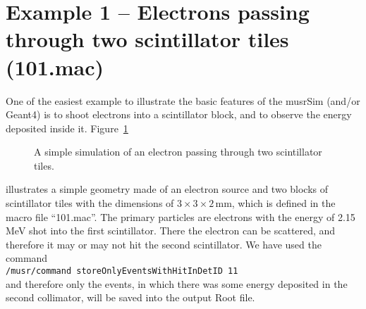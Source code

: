 \documentclass[twoside]{dis04}
\begin{document}
\section{Example 1 -- Electrons passing through two scintillator tiles (101.mac)}
One of the easiest example to illustrate the basic features of the musrSim (and/or Geant4) is to
shoot electrons into a scintillator block, and to observe the energy deposited inside it.
Figure~\ref{vis101}
%
\begin{figure}[tb]\centering
{}
\caption{A simple simulation of an electron passing through two
scintillator tiles.}
\label{vis101}
\end{figure}
%
illustrates a simple geometry made of an electron source and two blocks
of scintillator tiles with the dimensions of $3 \times 3 \times 2\,$mm,
which is defined in the macro file ``101.mac''.
The primary particles are electrons with the energy of 2.15\,MeV shot
into the first scintillator.  There the electron can be scattered, and therefore
it may or may not hit the second scintillator.  We have used the command\\[2ex]
{\tt /musr/command storeOnlyEventsWithHitInDetID 11}\\[2ex]
and therefore only the events, in which there was some energy deposited
in the second collimator, will be saved into the output Root file.
\end{document}
